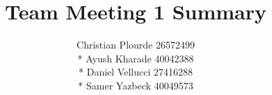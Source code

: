 \documentclass{article}
\begin{document}
\title{Team Meeting 1 Summary}
\author{Christian Plourde 26572499\\*
		Ayush Kharade 40042388\\*
		Daniel Vellucci 27416288\\*
		Samer Yazbeck 40049573
		}

\maketitle
\end{document}
